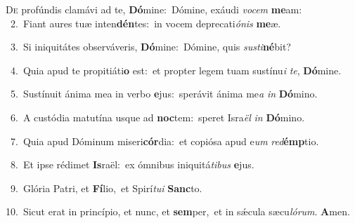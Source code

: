\lettrine{\initial\textcolor{\initialcolor}{D}}{e} profúndis clamávi ad te, \textbf{Dó}\-mine:~\star Dómine, exáudi \textit{vo}\-\textit{cem} \textbf{me}\-am:\\
{\numbfont\textcolor{\numbcolor}{~2.}}~Fiant aures tuæ inten\-\textbf{dén}\-tes:~\star in vocem deprecati\-\textit{ó}\-\textit{nis} \textbf{me}\-æ.\par
{\numbfont\textcolor{\numbcolor}{~3.}}~Si iniquitátes observáveris, \textbf{Dó}\-mine:~\star Dómine, quis \textit{sus}\-\textit{ti}\textbf{né}bit?\par
{\numbfont\textcolor{\numbcolor}{~4.}}~Quia apud te propitiáti\textbf{o} est:~\star et propter legem tuam sustínu\textit{i} \textit{te}\-, \textbf{Dó}\-mine.\par
{\numbfont\textcolor{\numbcolor}{~5.}}~Sustínuit ánima mea in verbo \textbf{e}\-jus:~\star sperávit ánima me\textit{a} \textit{in} \textbf{Dó}\-mino.\par
{\numbfont\textcolor{\numbcolor}{~6.}}~A custódia matutína usque ad \textbf{noc}\-tem:~\star speret Isra\textit{ël} \textit{in} \textbf{Dó}\-mino.\par
{\numbfont\textcolor{\numbcolor}{~7.}}~Quia apud Dóminum miseri\-\textbf{cór}\-dia:~\star et copiósa apud e\textit{um} \textit{red}\-\textbf{émp}tio.\par
{\numbfont\textcolor{\numbcolor}{~8.}}~Et ipse rédimet \textbf{Is}\-raël:~\star ex ómnibus iniquitá\-\textit{ti}\-\textit{bus} \textbf{e}\-jus.\par
{\numbfont\textcolor{\numbcolor}{~9.}}~Glória Patri, et \textbf{Fí}\-lio,~\star et Spirí\-\textit{tu}\-\textit{i} \textbf{Sanc}\-to.\par
{\numbfont\textcolor{\numbcolor}{10.}}~Sicut erat in princípio, et nunc, et \textbf{sem}\-per,~\star et in sǽcula sæcu\-\textit{ló}\-\textit{rum}. \textbf{A}\-men.\par
